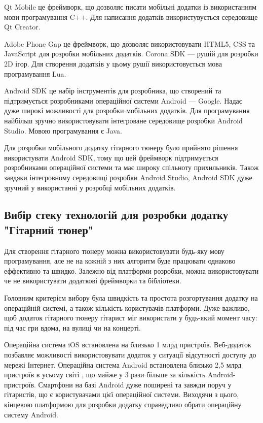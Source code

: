 Qt Mobile це фреймворк, що дозволяє писати мобільні додатки із використанням мови програмування C++. Для написання додатків використувується середовище Qt Creator. \cite{qt-mobile}

Adobe Phone Gap це фреймворк, що дозволяє використовувати HTML5, CSS та JavaScript для розробки мобільних додатків. Corona SDK — рушій для розробки 2D ігор. Для створення додатків у цьому рушії використовується мова програмування Lua.

Android SDK це набір інструментів для розробника, що створений та підтримується розробниками операційної системи Android — Google. Надає дуже широкі можливості для розробки мобільних додатків. Для програмування найбільш зручно використовувати інтегроване середовище розробки Android Studio. Мовою програмування є Java.
\cite{androiddevelopers} 

Для розробки мобільного додатку гітарного тюнеру було прийнято рішення використувати Android SDK, тому що цей фреймворк підтримується розробниками операційної системи та має широку спільноту прихильників. Також завдяки інтегровному середовищі розробки Android Studio, Android SDK дуже зручний у використанні у розробці мобільних додатків.

\subsection{Вибір стеку технологій для розробки додатку "Гітарний тюнер"}

Для створення гітарного тюнеру можна використовувати будь-яку мову програмування, але не на кожній з них алгоритм буде працювати однаково еффективно та швидко. Залежно від платформи розробки, можна використовувати че не використувати додаткові фреймворки та бібліотеки.

Головним критерієм вибору була швидкість та простота розгортування додатку на операційній системі, а також кількість користувачів платформи. Дуже важливо, щоб додаток гітарного тюнеру гітарист міг використати у будь-який момент часу: під час гри вдома, на вулиці чи на концерті. 

Операційна система iOS встановлена на близько 1 млрд пристроїв. Веб-додаток позбавляє можливості використовувати додаток у ситуації відсутності доступу до мережі Інтернет. Операційна система Android встановлена близько 2,5 млрд пристроїв в усьому світі \cite{androiddevelopers}, що майже у 3 рази більше за кількість Android-пристроїв. Смартфони на базі Android дуже поширені та завжди поруч у гітаристів, що є користувачами цієї операційної системи. Виходячи з цього, кінцевою платформою для розробки додатку справедливо обрати операційну систему Android.

